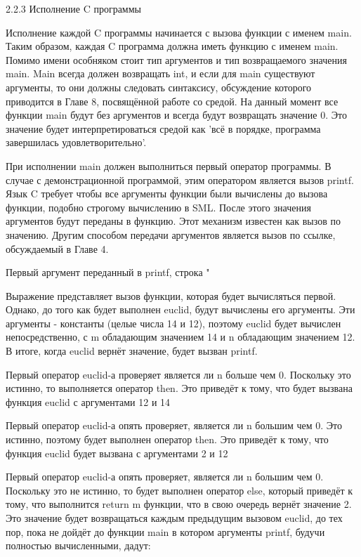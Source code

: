 2.2.3 Исполнение C программы

Исполнение каждой C программы начинается с вызова функции с именем main. Таким образом, каждая C программа должна иметь функцию с именем main. Помимо имени особняком стоит тип аргументов и тип возвращаемого значения main. Main всегда должен возвращать int, и если для main существуют аргументы, то они должны следовать синтаксису, обсуждение которого приводится в Главе 8, посвящённой работе со средой. На данный момент все функции main будут без аргументов и всегда будут возвращать значение 0. Это значение будет интерпретироваться средой как 'всё в порядке, программа завершилась удовлетворительно'.

При исполнении main должен выполниться первый оператор программы. В случае с демонстрационной программой, этим оператором является вызов printf. Язык C требует чтобы все аргументы функции были вычислены до вызова функции, подобно строгому вычислению в SML. После этого значения аргументов будут переданы в функцию. Этот механизм известен как вызов по значению. Другим способом передачи аргументов является вызов по ссылке, обсуждаемый в Главе 4.

Первый аргумент переданный в printf, строка "%

Выражение представляет вызов функции, которая будет вычисляться первой. Однако, до того как будет выполнен euclid, будут вычислены его аргументы. Эти аргументы - константы (целые числа 14 и 12), поэтому euclid будет вычислен непосредственно, с m обладающим значением 14 и n обладающим значением 12. В итоге, когда euclid вернёт значение, будет вызван printf.

Первый оператор euclid-а проверяет является ли n больше чем 0. Поскольку это истинно, то выполняется оператор then. Это приведёт к тому, что будет вызвана функция euclid с аргументами 12 и 14%

Первый оператор euclid-а опять проверяет, является ли n большим чем 0. Это истинно, поэтому будет выполнен оператор then. Это приведёт к тому, что функция euclid будет вызвана с аргументами 2 и 12%

Первый оператор euclid-а опять проверяет, является ли n большим чем 0. Поскольку это не истинно, то будет выполнен оператор else, который приведёт к тому, что выполнится return m функции, что в свою очередь вернёт значение 2. Это значение будет возвращаться каждым предыдущим вызовом euclid, до тех пор, пока не дойдёт до функции main в котором аргументы printf, будучи полностью вычисленными, дадут:

